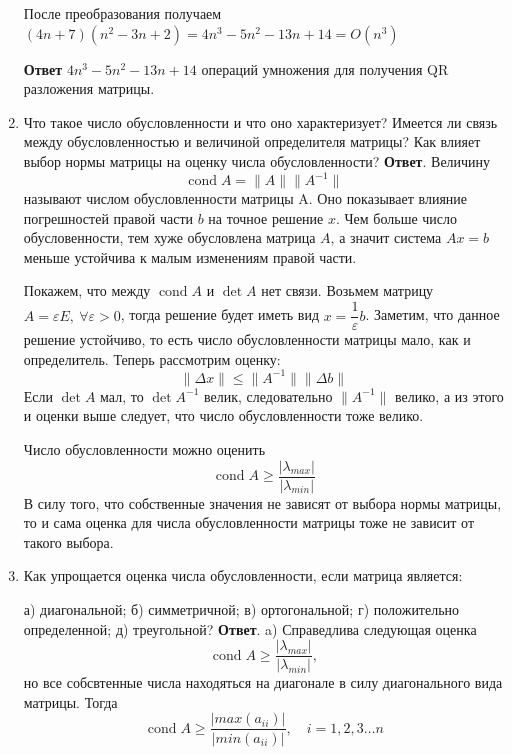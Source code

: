 \documentclass{article}
\newcommand{\cond}{\mathop{\mathrm{cond}}\nolimits}
\begin{document}
\begin{enumerate}
	После преобразования получаем $(4n+7)(n^2-3n+2) = 4n^3-5n^2-13n+14=O(n^3)$
	
	
	\textbf{Ответ} $4n^3-5n^2-13n+14$ операций умножения для получения QR разложения матрицы.
	
    \item Что такое число обусловленности и что оно характеризует?
    Имеется ли связь между обусловленностью и величиной
    определителя матрицы? Как влияет выбор нормы матрицы
    на оценку числа обусловленности?
    \newline
    {\bfseries Ответ}.
    Величину
    \begin{equation*}
        \cond A = \|A\| \|A^{-1}\|
    \end{equation*}
    называют числом обусловленности матрицы A. Оно показывает влияние погрешностей
    правой части $b$ на точное решение $x$. Чем больше число обусловенности, тем хуже 
    обусловлена матрица $A$, а значит система $A x = b$ меньше устойчива к малым изменениям правой части.
    
    Покажем, что между $\cond A$ и $\det A$ нет связи. 
    Возьмем матрицу $A = \varepsilon E, \ \forall \varepsilon > 0$, тогда
    решение будет иметь вид $x = \dfrac{1}{\varepsilon} b$. Заметим, что данное решение устойчиво, то есть 
    число обусловленности матрицы мало, как и определитель. 
    Теперь рассмотрим оценку:
    \begin{equation*}
      \|\Delta x\| \leqslant \|A^{-1}\| \|\Delta b\|
    \end{equation*}
    Если $\det A$ мал, то $\det A^{-1}$ велик, следовательно $\|A^{-1}\|$ велико,
    а из этого и оценки выше следует, что число обусловленности тоже велико.

    Число обусловленности можно оценить
    \begin{equation*}
        \cond A \geqslant \frac{| \lambda_{max}|}{|\lambda_{min}|} 
    \end{equation*}
    В силу того, что собственные значения не зависят от выбора нормы матрицы, то и 
    сама оценка для числа обусловленности матрицы тоже не зависит от такого выбора. 
    \item Как упрощается оценка числа обусловленности, если матрица
     является:
    
    а) диагональной;
    б) симметричной;
    в) ортогональной;
    г) положительно определенной;
    д) треугольной?
    \newline
    {\bfseries Ответ}.
    a) Справедлива следующая оценка
    \begin{equation}
        \cond A \geqslant \frac{| \lambda_{max}|}{|\lambda_{min}|},
        \label{estimate_cond}
    \end{equation}
    но все собсвтенные числа находяться на диагонале в силу диагонального вида матрицы.
    Тогда
    \begin{equation}
        \cond A \geqslant \frac{|max(a_{ii})|}{|min(a_{ii})|}, \quad i = 1,2,3 \ldots n
        \label{diag_matrix_estimate_cond}
    \end{equation}


\end{enumerate}
\end{document}
